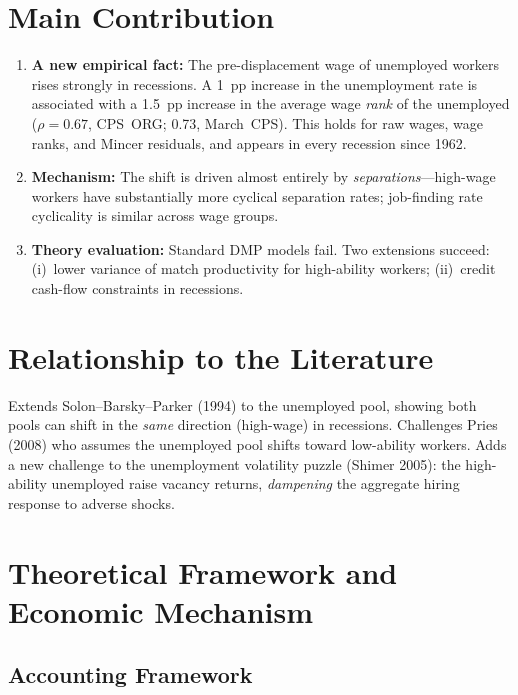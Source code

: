 \section{Main Contribution}

\begin{enumerate}
  \item \textbf{A new empirical fact:} The pre-displacement wage of unemployed
    workers rises strongly in recessions. A 1~pp increase in the unemployment
    rate is associated with a 1.5~pp increase in the average wage \emph{rank}
    of the unemployed ($\rho=0.67$, CPS~ORG; 0.73, March~CPS). This holds
    for raw wages, wage ranks, and Mincer residuals, and appears in every
    recession since 1962.
  \item \textbf{Mechanism:} The shift is driven almost entirely by
    \emph{separations}---high-wage workers have substantially more cyclical
    separation rates; job-finding rate cyclicality is similar across wage
    groups.
  \item \textbf{Theory evaluation:} Standard DMP models fail. Two extensions
    succeed: (i)~lower variance of match productivity for high-ability workers;
    (ii)~credit cash-flow constraints in recessions.
\end{enumerate}

\section{Relationship to the Literature}

Extends Solon--Barsky--Parker (1994) to the unemployed pool, showing both
pools can shift in the \emph{same} direction (high-wage) in recessions. Challenges
Pries (2008) who assumes the unemployed pool shifts toward low-ability workers.
Adds a new challenge to the unemployment volatility puzzle (Shimer 2005): the
high-ability unemployed raise vacancy returns, \emph{dampening} the aggregate
hiring response to adverse shocks.

\section{Theoretical Framework and Economic Mechanism}

\subsection*{Accounting Framework}

